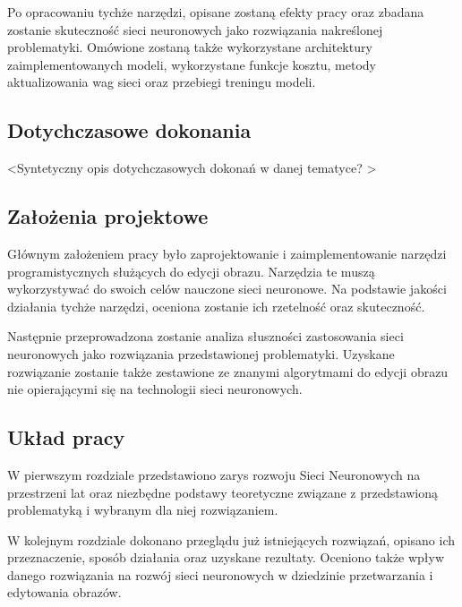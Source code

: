    Po opracowaniu tychże narzędzi, opisane zostaną efekty pracy oraz
    zbadana zostanie skuteczność sieci neuronowych jako rozwiązania nakreślonej
    problematyki. Omówione zostaną także wykorzystane architektury zaimplementowanych
    modeli, wykorzystane funkcje kosztu, metody aktualizowania wag sieci oraz
    przebiegi treningu modeli.

  \subsection{Dotychczasowe dokonania}
    \textless Syntetyczny opis dotychczasowych dokonań w danej tematyce?
    \textgreater

  \subsection{Założenia projektowe}
    Głównym założeniem pracy było zaprojektowanie i zaimplementowanie
    narzędzi programistycznych służących do edycji obrazu. Narzędzia te muszą
    wykorzystywać do swoich celów nauczone sieci neuronowe. Na podstawie jakości
    działania tychże narzędzi, oceniona zostanie ich rzetelność oraz skuteczność.

    Następnie przeprowadzona zostanie analiza słuszności zastosowania sieci
    neuronowych jako rozwiązania przedstawionej problematyki. Uzyskane
    rozwiązanie zostanie także zestawione ze znanymi algorytmami do edycji
    obrazu nie opierającymi się na technologii sieci neuronowych.

  \subsection{Układ pracy}
    W pierwszym rozdziale przedstawiono zarys rozwoju Sieci Neuronowych
    na przestrzeni lat oraz niezbędne podstawy teoretyczne związane
    z przedstawioną problematyką i wybranym dla niej rozwiązaniem.

    W kolejnym rozdziale dokonano przeglądu już istniejących rozwiązań, opisano
    ich przeznaczenie, sposób działania oraz uzyskane rezultaty.
    Oceniono także wpływ danego rozwiązania na rozwój sieci neuronowych w
    dziedzinie przetwarzania i edytowania obrazów.
